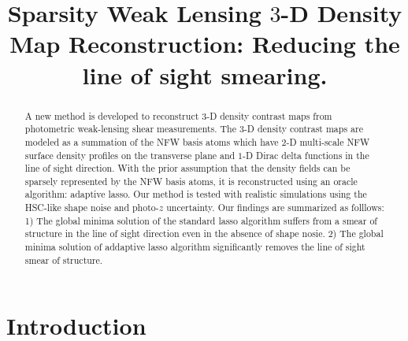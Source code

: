 \documentclass[twocolumn]{aastex62}
\begin{document}
\title{Sparsity Weak Lensing $3$-D Density Map Reconstruction:
Reducing the line of sight smearing.}

\begin{abstract}
A new method is developed to reconstruct $3$-D density contrast maps from photometric weak-lensing shear measurements.
The $3$-D density contrast maps are modeled as a summation of the NFW basis atoms which have $2$-D multi-scale NFW surface
density profiles on the transverse plane and $1$-D Dirac delta functions in the line of sight direction. With the prior
assumption that the density fields can be sparsely represented by the NFW basis atoms, it is reconstructed using an
oracle algorithm: adaptive lasso. Our method is tested with realistic simulations using the HSC-like shape noise and
photo-$z$ uncertainty.
Our findings are summarized as folllows: 1) The global minima solution of the standard lasso algorithm suffers from a
smear of structure in the line of sight direction even in the absence of shape nosie.
2) The global minima solution of addaptive lasso algorithm significantly removes the line of sight smear of structure.
\end{abstract}

\section{Introduction}
\end{document}
